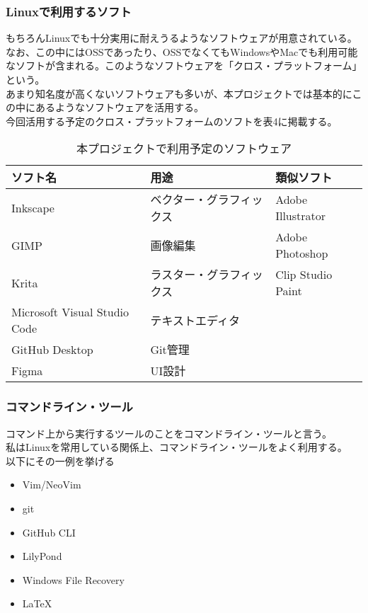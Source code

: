 \documentclass{ltjsarticle}
\begin{document}
\subsubsection{Linuxで利用するソフト}
もちろんLinuxでも十分実用に耐えうるようなソフトウェアが用意されている。\\
なお、この中にはOSSであったり、OSSでなくてもWindowsやMacでも利用可能なソフトが含まれる。このようなソフトウェアを「クロス・プラットフォーム」という。\\
あまり知名度が高くないソフトウェアも多いが、本プロジェクトでは基本的にこの中にあるようなソフトウェアを活用する。\\
今回活用する予定のクロス・プラットフォームのソフトを表4に掲載する。
\begin{table}
    \caption{本プロジェクトで利用予定のソフトウェア}
    \begin{center}
        \begin{tabular}{lll}\hline
            ソフト名 & 用途 & 類似ソフト \\ \hline \hline
            Inkscape & ベクター・グラフィックス & Adobe Illustrator \\ \hline
            GIMP & 画像編集 & Adobe Photoshop \\ \hline
            Krita & ラスター・グラフィックス & Clip Studio Paint \\ \hline
            Microsoft Visual Studio Code & テキストエディタ \\ \hline
            GitHub Desktop & Git管理 \\ \hline
            Figma & UI設計 \\ \hline
        \end{tabular}
    \end{center}
\end{table}
\subsubsection{コマンドライン・ツール}
コマンド上から実行するツールのことをコマンドライン・ツールと言う。\\
私はLinuxを常用している関係上、コマンドライン・ツールをよく利用する。\\
以下にその一例を挙げる
\begin{itemize}
    \item Vim/NeoVim
    \item git
    \item GitHub CLI
    \item LilyPond
    \item Windows File Recovery
    \item LaTeX
\end{itemize}
\end{document}
